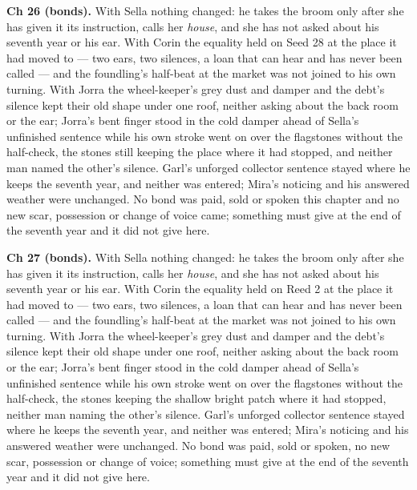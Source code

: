 \documentclass{design/chronicle}
\begin{document}
{\textbf{Ch 26 (bonds).} With Sella nothing changed: he takes the broom only after she has given it its instruction, calls her \emph{house}, and she has not asked about his seventh year or his ear. With Corin the equality held on Seed 28 at the place it had moved to — two ears, two silences, a loan that can hear and has never been called — and the foundling’s half-beat at the market was not joined to his own turning. With Jorra the wheel-keeper’s grey dust and damper and the debt’s silence kept their old shape under one roof, neither asking about the back room or the ear; Jorra’s bent finger stood in the cold damper ahead of Sella’s unfinished sentence while his own stroke went on over the flagstones without the half-check, the stones still keeping the place where it had stopped, and neither man named the other’s silence. Garl’s unforged collector sentence stayed where he keeps the seventh year, and neither was entered; Mira’s noticing and his answered weather were unchanged. No bond was paid, sold or spoken this chapter and no new scar, possession or change of voice came; something must give at the end of the seventh year and it did not give here.

\textbf{Ch 27 (bonds).} With Sella nothing changed: he takes the broom only after she has given it its instruction, calls her \emph{house}, and she has not asked about his seventh year or his ear. With Corin the equality held on Reed 2 at the place it had moved to — two ears, two silences, a loan that can hear and has never been called — and the foundling’s half-beat at the market was not joined to his own turning. With Jorra the wheel-keeper’s grey dust and damper and the debt’s silence kept their old shape under one roof, neither asking about the back room or the ear; Jorra’s bent finger stood in the cold damper ahead of Sella’s unfinished sentence while his own stroke went on over the flagstones without the half-check, the stones keeping the shallow bright patch where it had stopped, neither man naming the other’s silence. Garl’s unforged collector sentence stayed where he keeps the seventh year, and neither was entered; Mira’s noticing and his answered weather were unchanged. No bond was paid, sold or spoken, no new scar, possession or change of voice; something must give at the end of the seventh year and it did not give here.

}
\end{document}
